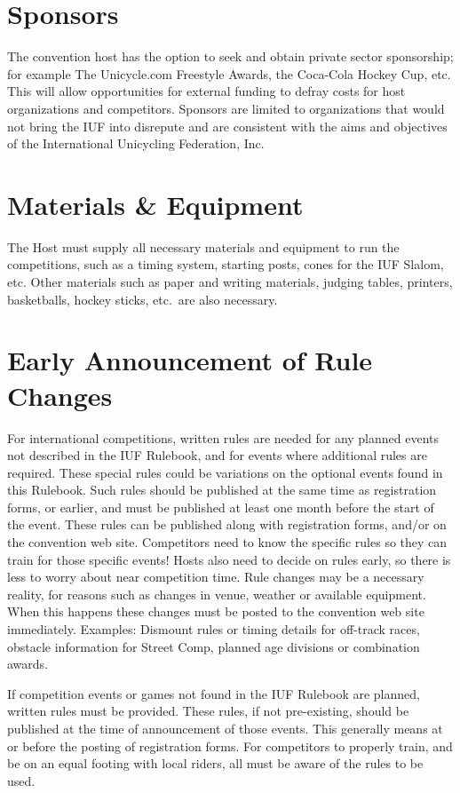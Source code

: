 \section{Sponsors}

The convention host has the option to seek and obtain private sector sponsorship; for example The Unicycle.com Freestyle Awards, the Coca-Cola Hockey Cup, etc.
This will allow opportunities for external funding to defray costs for host organizations and competitors.
Sponsors are limited to organizations that would not bring the IUF into disrepute and are consistent with the aims and objectives of the International Unicycling Federation, Inc.

\section{Materials \& Equipment}
The Host must supply all necessary materials and equipment to run the competitions, such as a timing system, starting posts, cones for the IUF Slalom, etc.
Other materials such as paper and writing materials, judging tables, printers, basketballs, hockey sticks, etc.\ are also necessary.

\section{Early Announcement of Rule Changes}
For international competitions, written rules are needed for any planned events not described in the IUF Rulebook, and for events where additional rules are required.
These special rules could be variations on the optional events found in this Rulebook.
Such rules should be published at the same time as registration forms, or earlier, and must be published at least one month before the start of the event.
These rules can be published along with registration forms, and/or on the convention web site.
Competitors need to know the specific rules so they can train for those specific events!
Hosts also need to decide on rules early, so there is less to worry about near competition time.
Rule changes may be a necessary reality, for reasons such as changes in venue, weather or available equipment.
When this happens these changes must be posted to the convention web site immediately.
Examples: Dismount rules or timing details for off-track races, obstacle information for Street Comp, planned age divisions or combination awards.

If competition events or games not found in the IUF Rulebook are planned, written rules must be provided.
These rules, if not pre-existing, should be published at the time of announcement of those events.
This generally means at or before the posting of registration forms.
For competitors to properly train, and be on an equal footing with local riders, all must be aware of the rules to be used.

